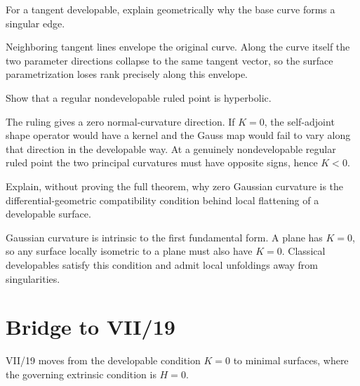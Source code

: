 \begin{problem}\label{prob:vii18-ch03}
For a tangent developable, explain geometrically why the base curve forms a singular edge.
\end{problem}
\begin{solution}
Neighboring tangent lines envelope the original curve. Along the curve itself the two parameter directions collapse to the same tangent vector, so the surface parametrization loses rank precisely along this envelope.
\end{solution}

\begin{problem}\label{prob:vii18-ch04}
Show that a regular nondevelopable ruled point is hyperbolic.
\end{problem}
\begin{solution}
The ruling gives a zero normal-curvature direction. If \(K=0\), the self-adjoint shape operator would have a kernel and the Gauss map would fail to vary along that direction in the developable way. At a genuinely nondevelopable regular ruled point the two principal curvatures must have opposite signs, hence \(K<0\).
\end{solution}

\begin{problem}\label{prob:vii18-ch05}
Explain, without proving the full theorem, why zero Gaussian curvature is the differential-geometric compatibility condition behind local flattening of a developable surface.
\end{problem}
\begin{solution}
Gaussian curvature is intrinsic to the first fundamental form. A plane has \(K=0\), so any surface locally isometric to a plane must also have \(K=0\). Classical developables satisfy this condition and admit local unfoldings away from singularities.
\end{solution}

\section*{Bridge to VII/19}
VII/19 moves from the developable condition \(K=0\) to minimal surfaces, where the governing extrinsic condition is \(H=0\).
